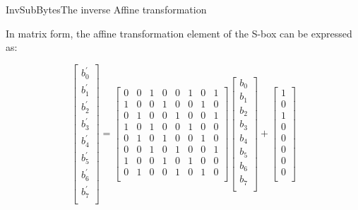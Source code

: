 \begin{frame}[t]{InvSubBytes}{The inverse Affine transformation}
	
	In matrix form, the affine transformation element of the S-box can be expressed as:
	
	\[
	\begin{bmatrix}
	b_0^{'} \\
	b_1^{'} \\
	b_2^{'} \\
	b_3^{'} \\
	b_4^{'} \\
	b_5^{'} \\
	b_6^{'} \\
	b_7^{'} \\	
	\end{bmatrix}
	=
	\begin{bmatrix}
	0 & 0 & 1 & 0 & 0 & 1 & 0 & 1\\
	1 & 0 & 0 & 1 & 0 & 0 & 1 & 0\\
	0 & 1 & 0 & 0 & 1 & 0 & 0 & 1\\
	1 & 0 & 1 & 0 & 0 & 1 & 0 & 0\\
	0 & 1 & 0 & 1 & 0 & 0 & 1 & 0\\
	0 & 0 & 1 & 0 & 1 & 0 & 0 & 1\\
	1 & 0 & 0 & 1 & 0 & 1 & 0 & 0\\
	0 & 1 & 0 & 0 & 1 & 0 & 1 & 0\\
	
	\end{bmatrix}
	\begin{bmatrix}
	b_0 \\
	b_1 \\
	b_2 \\
	b_3 \\
	b_4 \\
	b_5 \\
	b_6 \\
	b_7 \\	
	\end{bmatrix}
	+
	\begin{bmatrix}
	1 \\
	0 \\
	1 \\
	0 \\
	0 \\
	0 \\
	0 \\
	0 \\	
	\end{bmatrix}
	\]
	
\end{frame}

